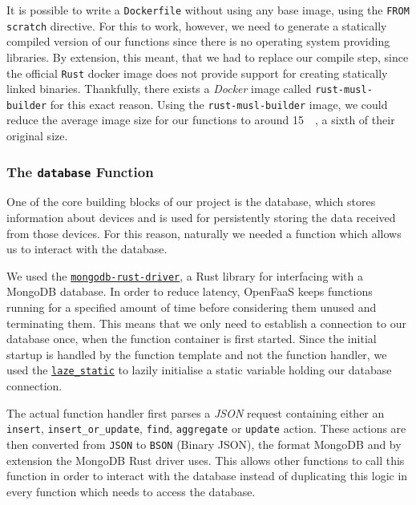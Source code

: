 It is possible to write a \texttt{Dockerfile} without using any base image, using the \texttt{FROM
scratch} directive. For this to work, however, we need to generate a statically compiled version of
our functions since there is no operating system providing libraries. By extension, this meant, that
we had to replace our compile step, since the official \texttt{Rust} docker image does not provide
support for creating statically linked binaries. Thankfully, there exists a \textit{Docker} image
called \texttt{rust-musl-builder} \cite{rust-musl-builder} for this exact reason. Using the
\texttt{rust-musl-builder} image, we could reduce the average image size for our functions to around
\SI{15}{\mega\byte}, a sixth of their original size.

\subsubsection{The \texttt{database} Function}

One of the core building blocks of our project is the database, which stores information about
devices and is used for persistently storing the data received from those devices. For this reason,
naturally we needed a function which allows us to interact with the database.

We used the \href{https://github.com/mongodb/mongo-rust-driver}{\texttt{mongodb-rust-driver}}, a
Rust library for interfacing with a MongoDB database. In order to reduce latency, OpenFaaS keeps
functions running for a specified amount of time before considering them unused and terminating
them. This means that we only need to establish a connection to our database once, when the function
container is first started. Since the initial startup is handled by the function template and not
the function handler, we used the
\href{https://github.com/rust-lang-nursery/lazy-static.rs}{\texttt{laze\_static}} to lazily
initialise a static variable holding our database connection.

The actual function handler first parses a \textit{JSON} request containing either an
\texttt{insert}, \texttt{insert\_or\_update}, \texttt{find}, \texttt{aggregate} or \texttt{update}
action. These actions are then converted from \texttt{JSON} to \texttt{BSON} (Binary JSON), the
format MongoDB and by extension the MongoDB Rust driver uses. This allows other functions to call
this function in order to interact with the database instead of duplicating this logic in every
function which needs to access the database.

